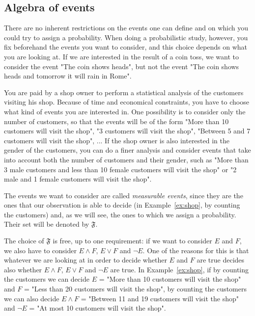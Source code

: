\subsection{Algebra of events}
\label{ss:algebra}

There are no inherent restrictions on the events one can define and on which you could try to assign a probability. When doing a probabilistic study, however, you fix beforehand the events you want to consider, and this choice depends on what you are looking at. If we are interested in the result of a coin toss, we want to consider the event "The coin shows heads", but not the event "The coin shows heads and tomorrow it will rain in Rome". 

\begin{example}
	\label{ex:shop}
	You are paid by a shop owner to perform a statistical analysis of the customers visiting his shop. Because of time and economical constraints, you have to choose what kind of events you are interested in. One possibility is to consider only the number of customers, so that the events will be of the form "More than 10 customers will visit the shop", "3 customers will visit the shop", "Between 5 and 7 customers will visit the shop", ... 
	If the shop owner is also interested in the gender of the customers, you can do a finer analysis and consider events that take into account both the number of customers and their gender, such as "More than 3 male customers and less than 10 female customers will visit the shop" or "2 male and 1 female customers will visit the shop". 
\end{example}

The events we want to consider are called \emph{measurable events}, since they are the ones that our observation is able to decide (in Example~\ref{ex:shop}, by counting the customers) and, as we will see, the ones to which we assign a probability. Their set will be denoted by $\mathfrak F$. 

The choice of $\mathfrak F$ is free, up to one requirement: if we want to consider $E$ and $F$, we also have to consider $E \wedge F$, $E \vee F$ and $\neg E$. One of the reasons for this is that whatever we are looking at in order to decide whether $E$ and $F$ are true decides also whether $E \wedge F$, $E \vee F$ and $\neg E$ are true. In Example~\ref{ex:shop}, if by counting the customers we can decide $E$ = "More than 10 customers will visit the shop" and $F$ = "Less than 20 customers will visit the shop", by counting the customers we can also decide $E \wedge F$ = "Between 11 and 19 customers will visit the shop" and $\neg E$ = "At most 10 customers will visit the shop". 


